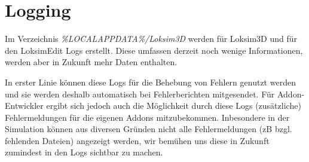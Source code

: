 \section{Logging}
\label{sec:editor-logging}

Im Verzeichnis \emph{\%LOCALAPPDATA\%/Loksim3D} werden für Loksim3D und für den LoksimEdit Logs erstellt. Diese umfassen derzeit noch wenige Informationen, werden aber in Zukunft mehr Daten enthalten.

In erster Linie können diese Logs für die Behebung von Fehlern genutzt werden und sie werden deshalb automatisch bei Fehlerberichten mitgesendet. Für Addon-Entwickler ergibt sich jedoch auch die Möglichkeit durch diese Logs (zusätzliche) Fehlermeldungen für die eigenen Addons mitzubekommen. Inbesondere in der Simulation können aus diversen Gründen nicht alle Fehlermeldungen (zB bzgl. fehlenden Dateien) angezeigt werden, wir bemühen uns diese in Zukunft zumindest in den Logs sichtbar zu machen.